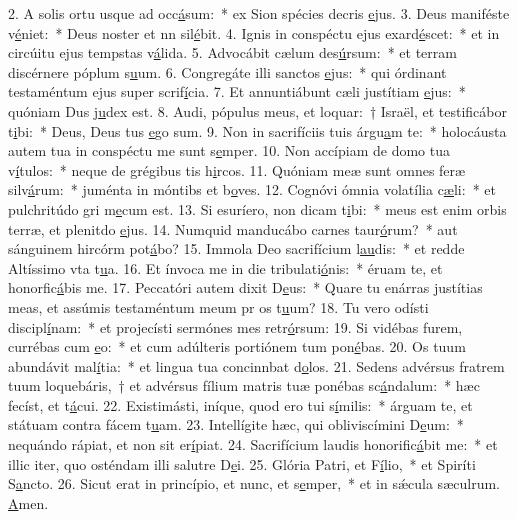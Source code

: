 2. A solis ortu usque ad occ\uline{á}sum:~* ex Sion spécies decris \uline{e}jus.
3. Deus maniféste v\uline{é}niet:~* Deus noster et nn sil\uline{é}bit.
4. Ignis in conspéctu ejus exard\uline{é}scet:~* et in circúitu ejus tempstas v\uline{á}lida.
5. Advocábit cælum des\uline{ú}rsum:~* et terram discérnere póplum s\uline{u}um.
6. Congregáte illi sanctos \uline{e}jus:~* qui órdinant testaméntum ejus super scrif\uline{í}cia.
7. Et annuntiábunt cæli justítiam \uline{e}jus:~* quóniam Dus j\uline{u}dex est.
8. Audi, pópulus meus, et loquar:~† Israël, et testificábor t\uline{i}bi:~* Deus, Deus tus \uline{e}go sum.
9. Non in sacrifíciis tuis árgu\uline{a}m te:~* holocáusta autem tua in conspéctu me sunt s\uline{e}mper.
10. Non accípiam de domo tua v\uline{í}tulos:~* neque de grégibus tis h\uline{i}rcos.
11. Quóniam meæ sunt omnes feræ silv\uline{á}rum:~* juménta in móntibs et b\uline{o}ves.
12. Cognóvi ómnia volatília c\uline{æ}li:~* et pulchritúdo gri m\uline{e}cum est.
13. Si esuríero, non dicam t\uline{i}bi:~* meus est enim orbis terræ, et plenitdo \uline{e}jus.
14. Numquid manducábo carnes taur\uline{ó}rum?~* aut sánguinem hircórm pot\uline{á}bo?
15. Immola Deo sacrifícium l\uline{au}dis:~* et redde Altíssimo vta t\uline{u}a.
16. Et ínvoca me in die tribulati\uline{ó}nis:~* éruam te, et honorfic\uline{á}bis me.
17. Peccatóri autem dixit D\uline{e}us:~* Quare tu enárras justítias meas, et assúmis testaméntum meum pr os t\uline{u}um?
18. Tu vero odísti discipl\uline{í}nam:~* et projecísti sermónes mes retr\uline{ó}rsum:
19. Si vidébas furem, currébas cum \uline{e}o:~* et cum adúlteris portiónem tum pon\uline{é}bas.
20. Os tuum abundávit mal\uline{í}tia:~* et lingua tua concinnbat d\uline{o}los.
21. Sedens advérsus fratrem tuum loquebáris,~† et advérsus fílium matris tuæ ponébas sc\uline{á}ndalum:~* hæc fecíst, et t\uline{á}cui.
22. Existimásti, iníque, quod ero tui s\uline{í}milis:~* árguam te, et státuam contra fácem t\uline{u}am.
23. Intellígite hæc, qui obliviscímini D\uline{e}um:~* nequándo rápiat, et non sit  er\uline{í}piat.
24. Sacrifícium laudis honorific\uline{á}bit me:~* et illic iter, quo osténdam illi salutre D\uline{e}i.
25. Glória Patri, et F\uline{í}lio,~* et Spiríti S\uline{a}ncto.
26. Sicut erat in princípio, et nunc, et s\uline{e}mper,~* et in sǽcula sæculrum. \uline{A}men.
